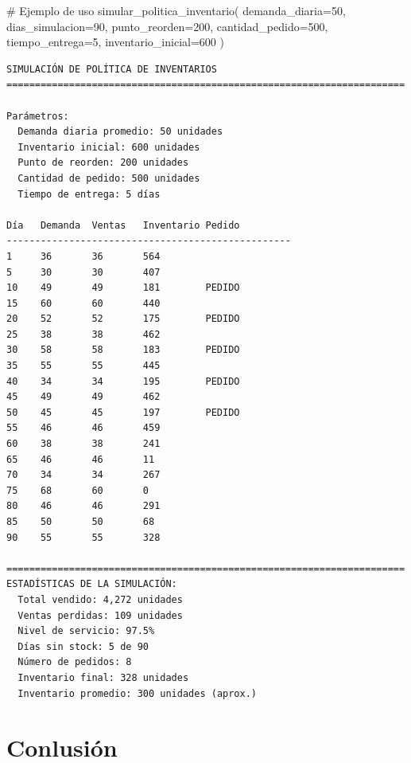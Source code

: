 \documentclass[
  doc,
  floatsintext,
  longtable,
  a4paper,
  nolmodern,
  notxfonts,
  notimes,
  12pt,
  colorlinks=true,linkcolor=blue,citecolor=blue,urlcolor=blue]{apa7}
\newenvironment{Shaded}{\begin{snugshade}}{\end{snugshade}}
\newcommand{\CommentTok}[1]{\textcolor[rgb]{0.37,0.37,0.37}{#1}}
\newcommand{\DecValTok}[1]{\textcolor[rgb]{0.68,0.00,0.00}{#1}}
\newcommand{\NormalTok}[1]{\textcolor[rgb]{0.00,0.23,0.31}{#1}}
\newcommand{\OperatorTok}[1]{\textcolor[rgb]{0.37,0.37,0.37}{#1}}
\begin{document}
\begin{Shaded}
\begin{Highlighting}[]
\CommentTok{\# Ejemplo de uso}
\NormalTok{simular\_politica\_inventario(}
\NormalTok{    demanda\_diaria}\OperatorTok{=}\DecValTok{50}\NormalTok{,}
\NormalTok{    dias\_simulacion}\OperatorTok{=}\DecValTok{90}\NormalTok{,}
\NormalTok{    punto\_reorden}\OperatorTok{=}\DecValTok{200}\NormalTok{,}
\NormalTok{    cantidad\_pedido}\OperatorTok{=}\DecValTok{500}\NormalTok{,}
\NormalTok{    tiempo\_entrega}\OperatorTok{=}\DecValTok{5}\NormalTok{,}
\NormalTok{    inventario\_inicial}\OperatorTok{=}\DecValTok{600}
\NormalTok{)}
\end{Highlighting}
\end{Shaded}

\begin{verbatim}
SIMULACIÓN DE POLÍTICA DE INVENTARIOS
======================================================================

Parámetros:
  Demanda diaria promedio: 50 unidades
  Inventario inicial: 600 unidades
  Punto de reorden: 200 unidades
  Cantidad de pedido: 500 unidades
  Tiempo de entrega: 5 días

Día   Demanda  Ventas   Inventario Pedido  
--------------------------------------------------
1     36       36       564                
5     30       30       407                
10    49       49       181        PEDIDO  
15    60       60       440                
20    52       52       175        PEDIDO  
25    38       38       462                
30    58       58       183        PEDIDO  
35    55       55       445                
40    34       34       195        PEDIDO  
45    49       49       462                
50    45       45       197        PEDIDO  
55    46       46       459                
60    38       38       241                
65    46       46       11                 
70    34       34       267                
75    68       60       0                  
80    46       46       291                
85    50       50       68                 
90    55       55       328                

======================================================================
ESTADÍSTICAS DE LA SIMULACIÓN:
  Total vendido: 4,272 unidades
  Ventas perdidas: 109 unidades
  Nivel de servicio: 97.5%
  Días sin stock: 5 de 90
  Número de pedidos: 8
  Inventario final: 328 unidades
  Inventario promedio: 300 unidades (aprox.)
\end{verbatim}

\section{Conlusión}\label{conlusiuxf3n}
\end{document}

